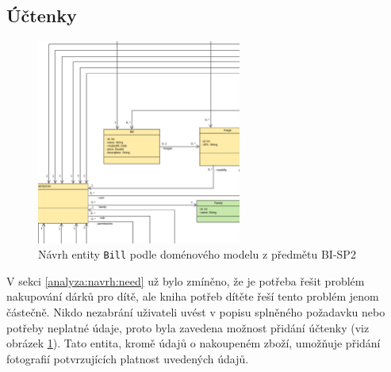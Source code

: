    \subsection{Účtenky}
        \begin{figure}\centering
	        \includegraphics[width=0.6\textwidth]{pdfs/Bill1}
	        \caption[Návrh entity \texttt{Bill}]{Návrh entity \texttt{Bill} podle doménového modelu z předmětu BI-SP2}\label{image:bill1}
        \end{figure}
        V sekci \ref{analyza:navrh:need} už bylo zmíněno, že je potřeba řešit problém nakupování dárků pro dítě, ale kniha potřeb dítěte řeší tento problém jenom částečně. Nikdo nezabrání uživateli uvést v popisu splněného požadavku nebo potřeby neplatné údaje, proto byla zavedena možnost přidání účtenky (viz obrázek \ref{image:bill1}). Tato entita, kromě údajů o nakoupeném zboží, umožňuje přidání fotografií potvrzujících platnost uvedených údajů.
    
